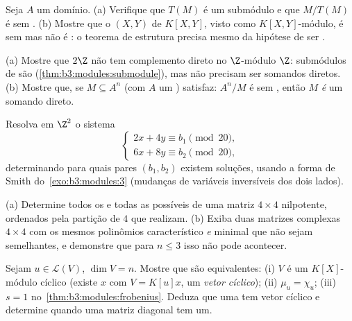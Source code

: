 \begin{exercise}[$\star\star$]\label{exo:b3:modules:5}
Seja $A$ um domínio. (a) Verifique que $T(M)$ é um submódulo e
que $M/T(M)$ é sem . (b) Mostre que o  $(X, Y)$ de
$K[X,Y]$, visto como $K[X,Y]$-módulo, é sem  mas não é
: o teorema de estrutura precisa mesmo da hipótese de ser .
\end{exercise}

\begin{exercise}[$\star\star$]\label{exo:b3:modules:6}
(a) Mostre que $2\Z$ não tem complemento direto no $\Z$-módulo
$\Z$: submódulos de  são  (\cref{thm:b3:modules:submodule}), mas
não precisam ser somandos diretos. (b) Mostre que, se $M \subseteq A^n$ (com
$A$ um ) satisfaz: $A^n/M$ é sem , então $M$
\emph{é} um somando direto.
\end{exercise}

\begin{exercise}[$\star\star$]\label{exo:b3:modules:7}
Resolva em $\Z^2$ o sistema
\[
\begin{cases}
2x + 4y \equiv b_1 \pmod{20},\\
6x + 8y \equiv b_2 \pmod{20},
\end{cases}
\]
determinando para quais pares $(b_1, b_2)$ existem soluções, usando a forma de
Smith do~\cref{exo:b3:modules:3} (mudanças de variáveis inversíveis dos dois
lados).
\end{exercise}

\begin{exercise}[$\star\star$]\label{exo:b3:modules:8}
(a) Determine todos os  e todas as  possíveis de uma matriz $4 \times 4$ nilpotente, ordenados pela
partição de $4$ que realizam.
(b) Exiba duas matrizes complexas $4\times4$ com os mesmos polinômios
característico \emph{e} minimal que não sejam semelhantes, e demonstre
que para $n \leq 3$ isso não pode acontecer.
\end{exercise}

\begin{exercise}[$\star\star\star$]\label{exo:b3:modules:9}
Sejam $u \in \mathcal L(V)$, $\dim V = n$. Mostre que são equivalentes: (i) $V$ é um
$K[X]$-módulo cíclico (existe $x$ com $V = K[u]x$, um \emph{vetor
cíclico}); (ii) $\mu_u = \chi_u$; (iii) $s = 1$ no~\cref{thm:b3:modules:frobenius}. Deduza que
uma  tem vetor cíclico e determine quando uma matriz
diagonal tem um.
\end{exercise}


